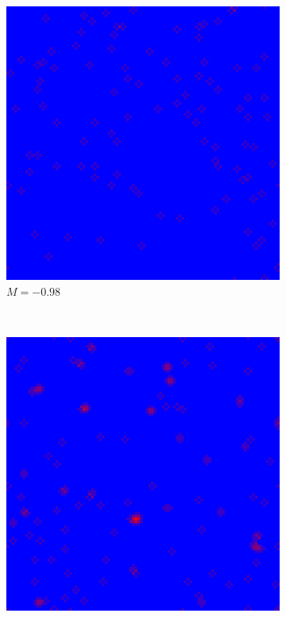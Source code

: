 \documentclass[a4paper,12pt]{article}
\theoremstyle{plain}
\theoremstyle{definition}
\begin{document}
      \begin{figure}[H]
         \centering
          \begin{subfigure}[t]{0.3\textwidth}
            \includegraphics[width=\textwidth]{398.png}
              \caption*{$M=-0.98$}
          \end{subfigure}
          ~
          \begin{subfigure}[t]{0.3\textwidth}
            \includegraphics[width=\textwidth]{397.png}

\end{subfigure}
\end{figure}
\end{document}
